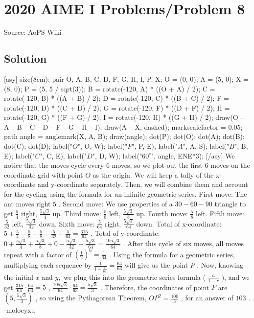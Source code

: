 \documentclass[12pt]{article}
\begin{document}
\section*{{2020 AIME I Problems/Problem 8}}
Source: AoPS Wiki

\subsection*{Solution}
[asy] size(8cm); pair O, A, B, C, D, F, G, H, I, P, X; O = (0, 0); A = (5, 0); X = (8, 0); P = (5, 5 / sqrt(3)); B = rotate(-120, A) * ((O + A) / 2); C = rotate(-120, B) * ((A + B) / 2); D = rotate(-120, C) * ((B + C) / 2); F = rotate(-120, D) * ((C + D) / 2); G = rotate(-120, F) * ((D + F) / 2); H = rotate(-120, G) * ((F + G) / 2); I = rotate(-120, H) * ((G + H) / 2); draw(O -- A -- B -- C -- D -- F -- G -- H -- I); draw(A -- X, dashed); markscalefactor = 0.05; path angle = anglemark(X, A, B); draw(angle); dot(P); dot(O); dot(A); dot(B); dot(C); dot(D); label("$O$", O, W); label("$P$", P, E); label("$A$", A, S); label("$B$", B, E); label("$C$", C, E); label("$D$", D, W); label("$60^\circ$", angle, ENE*3); [/asy] We notice that the moves cycle every 6 moves, so we plot out the first 6 moves on the coordinate grid with point $O$ as the origin. We will keep a tally of the x-coordinate and y-coordinate separately. Then, we will combine them and account for the cycling using the formula for an infinite geometric series. First move: The ant moves right $5$ .
Second move: We use properties of a $30-60-90$ triangle to get $\frac{5}{4}$ right, $\frac{5\sqrt{3}}{4}$ up.
Third move: $\frac{5}{8}$ left, $\frac{5\sqrt{3}}{8}$ up.
Fourth move: $\frac{5}{8}$ left.
Fifth move: $\frac{5}{32}$ left, $\frac{5\sqrt{3}}{32}$ down.
Sixth move: $\frac{5}{64}$ right, $\frac{5\sqrt{3}}{64}$ down. Total of x-coordinate: $5 + \frac{5}{4} - \frac{5}{8} - \frac{5}{8} - \frac{5}{32} + \frac{5}{64} = \frac{315}{64}$ .
Total of y-coordinate: $0 + \frac{5\sqrt{3}}{4} + \frac{5\sqrt{3}}{8} + 0 - \frac{5\sqrt{3}}{32} - \frac{5\sqrt{3}}{64} = \frac{105\sqrt{3}}{64}$ . After this cycle of six moves, all moves repeat with a factor of $(\frac{1}{2})^6 = \frac{1}{64}$ . Using the formula for a geometric series, multiplying each sequence by $\frac{1}{1-\frac{1}{64}} = \frac{64}{63}$ will give us the point $P$ . Now, knowing the initial $x$ and $y,$ we plug this into the geometric series formula ( $\frac{a}{1-r}$ ), and we get $\frac{315}{64} \cdot \frac{64}{63} = 5$ , $\frac{105\sqrt{3}}{64} \cdot \frac{64}{63} = \frac{5\sqrt{3}}{3}$ .
Therefore, the coordinates of point $P$ are $(5,\frac{5\sqrt{3}}{3})$ , so using the Pythagorean Theorem, $OP^2 = \frac{100}{3}$ , for an answer of $\boxed{103}$ . -molocyxu
\end{document}
